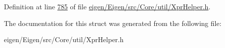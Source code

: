 Definition at line \hyperlink{eigen_2_eigen_2src_2_core_2util_2_xpr_helper_8h_source_l00785}{785} of file \hyperlink{eigen_2_eigen_2src_2_core_2util_2_xpr_helper_8h_source}{eigen/\+Eigen/src/\+Core/util/\+Xpr\+Helper.\+h}.



The documentation for this struct was generated from the following file\+:\begin{DoxyCompactItemize}
\item 
eigen/\+Eigen/src/\+Core/util/\+Xpr\+Helper.\+h\end{DoxyCompactItemize}
